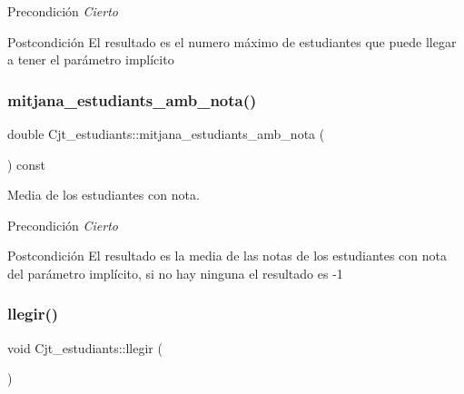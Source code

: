 \begin{DoxyPrecond}{Precondición}
{\itshape Cierto} 
\end{DoxyPrecond}
\begin{DoxyPostcond}{Postcondición}
El resultado es el numero máximo de estudiantes que puede llegar a tener el parámetro implícito 
\end{DoxyPostcond}
\mbox{\label{class_cjt__estudiants_a8c8099d5080864a677743e5e1d1bbdf8}} 
\subsubsection{\texorpdfstring{mitjana\+\_\+estudiants\+\_\+amb\+\_\+nota()}{mitjana\_estudiants\_amb\_nota()}}
{\footnotesize\ttfamily double Cjt\+\_\+estudiants\+::mitjana\+\_\+estudiants\+\_\+amb\+\_\+nota (\begin{DoxyParamCaption}{ }\end{DoxyParamCaption}) const}



Media de los estudiantes con nota. 

\begin{DoxyPrecond}{Precondición}
{\itshape Cierto} 
\end{DoxyPrecond}
\begin{DoxyPostcond}{Postcondición}
El resultado es la media de las notas de los estudiantes con nota del parámetro implícito, si no hay ninguna el resultado es -\/1 
\end{DoxyPostcond}
\mbox{\label{class_cjt__estudiants_aa24c2d4c36167b2b810ab459435b67a8}} 
\subsubsection{\texorpdfstring{llegir()}{llegir()}}
{\footnotesize\ttfamily void Cjt\+\_\+estudiants\+::llegir (\begin{DoxyParamCaption}{ }\end{DoxyParamCaption})}



